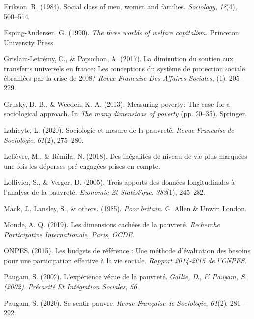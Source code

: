 \documentclass[12pt,a4paper]{reedthesis}
\newenvironment{CSLReferences}%
  {}%
  {\par}
\begin{document}
\begin{CSLReferences}{1}{0}
\leavevmode\hypertarget{ref-erikson1984social}{}%
Erikson, R. (1984). Social class of men, women and families. \emph{Sociology}, \emph{18}(4), 500--514.

\leavevmode\hypertarget{ref-esping1990three}{}%
Esping-Andersen, G. (1990). \emph{The three worlds of welfare capitalism}. Princeton University Press.

\leavevmode\hypertarget{ref-grislain2017diminution}{}%
Grislain-Letrémy, C., \& Papuchon, A. (2017). La diminution du soutien aux transferts universels en france: Les conceptions du syst{è}me de protection sociale {é}branl{é}es par la crise de 2008? \emph{Revue Francaise Des Affaires Sociales}, (1), 205--229.

\leavevmode\hypertarget{ref-grusky2013measuring}{}%
Grusky, D. B., \& Weeden, K. A. (2013). Measuring poverty: The case for a sociological approach. In \emph{The many dimensions of poverty} (pp. 20--35). Springer.

\leavevmode\hypertarget{ref-lahieyte2020sociologie}{}%
Lahieyte, L. (2020). Sociologie et mesure de la pauvret{é}. \emph{Revue Francaise de Sociologie}, \emph{61}(2), 275--280.

\leavevmode\hypertarget{ref-lelievre2018inegalites}{}%
Lelièvre, M., \& Rémila, N. (2018). Des in{é}galit{é}s de niveau de vie plus marqu{é}es une fois les d{é}penses pr{é}-engag{é}es prises en compte.

\leavevmode\hypertarget{ref-lollivier2005trois}{}%
Lollivier, S., \& Verger, D. (2005). Trois apports des donn{é}es longitudinales {à} l'analyse de la pauvret{é}. \emph{Economie Et Statistique}, \emph{383}(1), 245--282.

\leavevmode\hypertarget{ref-mack1985poor}{}%
Mack, J., Lansley, S., \& others. (1985). \emph{Poor britain}. G. Allen \& Unwin London.

\leavevmode\hypertarget{ref-atdquartmonde}{}%
Monde, A. Q. (2019). Les dimensions cachées de la pauvreté. \emph{Recherche Participative Internationale, Paris, OCDE}.

\leavevmode\hypertarget{ref-onpes}{}%
ONPES. (2015). Les budgets de référence : Une méthode d'évaluation des besoins pour une participation effective à la vie sociale. \emph{Rapport 2014-2015 de l'ONPES}.

\leavevmode\hypertarget{ref-paugam2002experience}{}%
Paugam, S. (2002). L'exp{é}rience v{é}cue de la pauvret{é}. \emph{Gallie, D., \& Paugam, S. (2002). Précarité Et Intégration Sociales}, \emph{56}.

\leavevmode\hypertarget{ref-paugam2020se}{}%
Paugam, S. (2020). Se sentir pauvre. \emph{Revue Fran{ç}aise de Sociologie}, \emph{61}(2), 281--292.


\end{CSLReferences}
\end{document}
